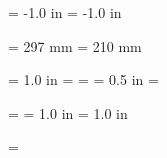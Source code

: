 


\setlength{\parindent}{0in}    
\setlength{\parskip}{0.5\baselineskip}

\hoffset        = -1.0 in
\voffset        = -1.0 in


\paperheight    = 297 mm
\paperwidth     = 210 mm


\topmargin      = 1.0 in
\headheight     = \baselineskip
\headsep        = \baselineskip
\footskip       = 0.5 in
\textheight     = \paperheight
\addtolength{\textheight}{-\topmargin}
\addtolength{\textheight}{-\headheight}
\addtolength{\textheight}{-\headsep}
\addtolength{\textheight}{-\footskip}
\addtolength{\textheight}{-1.0in}   %

\textwidth      = \paperwidth
\oddsidemargin  = 1.0 in
\evensidemargin = 1.0 in
\addtolength{\textwidth}{-\oddsidemargin}
\addtolength{\textwidth}{-\evensidemargin}

\linewidth      = \textwidth


